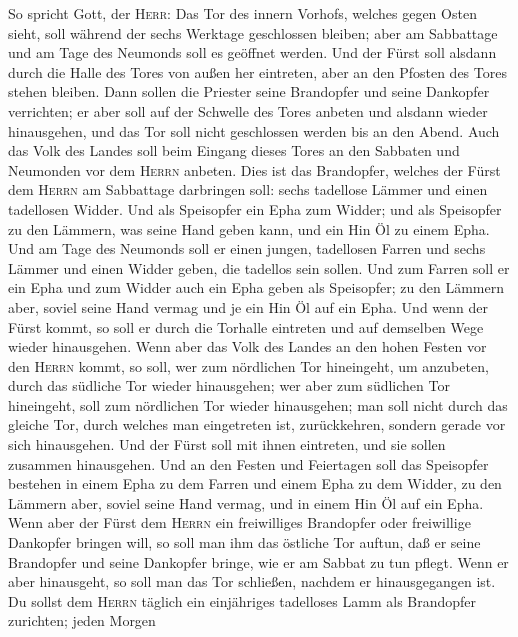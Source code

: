  So spricht Gott, der \textsc{Herr}: Das Tor des innern
Vorhofs, welches gegen Osten sieht, soll während der sechs Werktage
geschlossen bleiben; aber am Sabbattage und am Tage des Neumonds soll es
geöffnet werden.  Und der Fürst soll alsdann durch die
Halle des Tores von außen her eintreten, aber an den Pfosten des Tores
stehen bleiben. Dann sollen die Priester seine Brandopfer und seine
Dankopfer verrichten; er aber soll auf der Schwelle des Tores anbeten
und alsdann wieder hinausgehen, und das Tor soll nicht geschlossen
werden bis an den Abend.  Auch das Volk des Landes soll
beim Eingang dieses Tores an den Sabbaten und Neumonden vor dem
\textsc{Herrn} anbeten.  Dies ist das Brandopfer, welches
der Fürst dem \textsc{Herrn} am Sabbattage darbringen soll: sechs
tadellose Lämmer und einen tadellosen Widder.  Und als
Speisopfer ein Epha zum Widder; und als Speisopfer zu den Lämmern, was
seine Hand geben kann, und ein Hin Öl zu einem Epha.  Und
am Tage des Neumonds soll er einen jungen, tadellosen Farren und sechs
Lämmer und einen Widder geben, die tadellos sein sollen. 
Und zum Farren soll er ein Epha und zum Widder auch ein Epha geben als
Speisopfer; zu den Lämmern aber, soviel seine Hand vermag und je ein Hin
Öl auf ein Epha.  Und wenn der Fürst kommt, so soll er
durch die Torhalle eintreten und auf demselben Wege wieder hinausgehen.
 Wenn aber das Volk des Landes an den hohen Festen vor den
\textsc{Herrn} kommt, so soll, wer zum nördlichen Tor hineingeht, um
anzubeten, durch das südliche Tor wieder hinausgehen; wer aber zum
südlichen Tor hineingeht, soll zum nördlichen Tor wieder hinausgehen;
man soll nicht durch das gleiche Tor, durch welches man eingetreten ist,
zurückkehren, sondern gerade vor sich hinausgehen.  Und
der Fürst soll mit ihnen eintreten, und sie sollen zusammen hinausgehen.
 Und an den Festen und Feiertagen soll das Speisopfer
bestehen in einem Epha zu dem Farren und einem Epha zu dem Widder, zu
den Lämmern aber, soviel seine Hand vermag, und in einem Hin Öl auf ein
Epha.  Wenn aber der Fürst dem \textsc{Herrn} ein
freiwilliges Brandopfer oder freiwillige Dankopfer bringen will, so soll
man ihm das östliche Tor auftun, daß er seine Brandopfer und seine
Dankopfer bringe, wie er am Sabbat zu tun pflegt. Wenn er aber
hinausgeht, so soll man das Tor schließen, nachdem er hinausgegangen
ist.  Du sollst dem \textsc{Herrn} täglich ein
einjähriges tadelloses Lamm als Brandopfer zurichten; jeden Morgen
